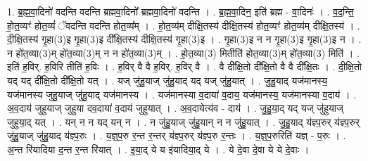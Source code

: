 \documentclass[17pt]{extarticle}
\begin{document}
1. ब्र॒ह्म॒वा॒दिनो॑ वदन्ति वदन्ति ब्रह्मवा॒दिनो᳚ ब्रह्मवा॒दिनो॑ वदन्ति । . ब्र॒ह्म॒वा॒दिन॒ इति॑ ब्रह्म - वा॒दिनः॑ । . व॒द॒न्ति॒ हो॒त॒व्यꣳ॑ होत॒व्यं॑ ॅवदन्ति वदन्ति होत॒व्य᳚म् । . हो॒त॒व्य॑म् दीक्षि॒तस्य॑ दीक्षि॒तस्य॑ होत॒व्यꣳ॑ होत॒व्य॑म् दीक्षि॒तस्य॑ । . दी॒क्षि॒तस्य॑ गृ॒हा(3)इ गृ॒हा(3)इ दी᳚क्षि॒तस्य॑ दीक्षि॒तस्य॑ गृ॒हा(3)इ । . गृ॒हा(3)इ न न गृ॒हा(3)इ गृ॒हा(3)इ न । . न हो॑त॒व्या(3)म् हो॑त॒व्या(3)म् न न हो॑त॒व्या(3)म् । . हो॒त॒व्या(3) मितीति॑ होत॒व्या(3)म् हो॑त॒व्या(3) मिति॑ । . इति॑ ह॒विर्. ह॒विरि तीति॑ ह॒विः । . ह॒विर् वै वै ह॒विर्. ह॒विर् वै । . वै दी᳚क्षि॒तो दी᳚क्षि॒तो वै वै दी᳚क्षि॒तः । . दी॒क्षि॒तो यद् यद् दी᳚क्षि॒तो दी᳚क्षि॒तो यत् । . यज् जु॑हु॒याज् जु॑हु॒याद् यद् यज् जु॑हु॒यात् । . जु॒हु॒याद् यज॑मानस्य॒ यज॑मानस्य जुहु॒याज् जु॑हु॒याद् यज॑मानस्य । . यज॑मानस्या व॒दाया॑ व॒दाय॒ यज॑मानस्य॒ यज॑मानस्या व॒दाय॑ । . अ॒व॒दाय॑ जुहुयाज् जुहुया दव॒दाया॑ व॒दाय॑ जुहुयात् । . अ॒व॒दायेत्य॑व - दाय॑ । . जु॒हु॒या॒द् यद् यज् जु॑हुयाज् जुहुया॒द् यत् । . यन् न न यद् यन् न । . न जु॑हु॒याज् जु॑हु॒यान् न न जु॑हु॒यात् । . जु॒हु॒याद् य॑ज्ञ्प॒रुर् य॑ज्ञ्प॒रुर् जु॑हु॒याज् जु॑हु॒याद् य॑ज्ञ्प॒रुः । . य॒ज्ञ्॒प॒रु र॒न्त र॒न्तर् य॑ज्ञ्प॒रुर् य॑ज्ञ्प॒रु र॒न्तः । . य॒ज्ञ्॒प॒रुरिति॑ यज्ञ् - प॒रुः । . अ॒न्त रि॑यादिया द॒न्त र॒न्त रि॑यात् । . इ॒या॒द् ये य इ॑यादिया॒द् ये । . ये दे॒वा दे॒वा ये ये दे॒वाः । \newline
\end{document}
